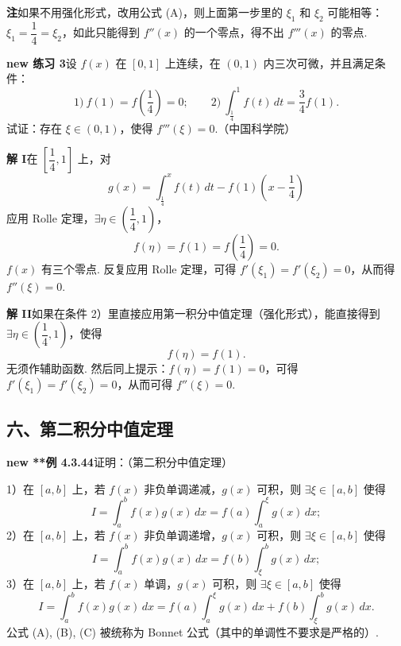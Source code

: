 \documentclass[UTF8, 12pt, fontset=fandol, oneside]{ctexart}
\begin{document}
\noindent\textbf{注}\quad 如果不用强化形式，改用公式 (A)，则上面第一步里的 $\xi_1$ 和 $\xi_2$ 可能相等：$\xi_1=\dfrac14=\xi_2$，如此只能得到 $f''(x)$ 的一个零点，得不出 $f'''(x)$ 的零点.

\noindent\textbf{new 练习 3}\quad 设 $f(x)$ 在 $[0,1]$ 上连续，在 $(0,1)$ 内三次可微，并且满足条件：
\[
1)\ f(1)=f\left(\frac14\right)=0;\qquad
2)\ \int_{\frac14}^1f(t)\,dt=\frac34f(1).
\]
试证：存在 $\xi\in(0,1)$，使得 $f'''(\xi)=0$.（中国科学院）

\noindent\textbf{解 I}\quad 在 $\left[\dfrac14,1\right]$ 上，对
\[
g(x)=\int_{\frac14}^x f(t)\,dt-f(1)\left(x-\frac14\right)
\]
应用 Rolle 定理，$\exists\eta\in\left(\dfrac14,1\right)$，
\[
f(\eta)=f(1)=f\left(\frac14\right)=0.
\]
$f(x)$ 有三个零点. 反复应用 Rolle 定理，可得 $f'(\xi_1)=f'(\xi_2)=0$，从而得
$f''(\xi)=0$.

\noindent\textbf{解 II}\quad 如果在条件 2）里直接应用第一积分中值定理（强化形式），能直接得到 $\exists\eta\in\left(\dfrac14,1\right)$，使得
\[
f(\eta)=f(1).
\]
无须作辅助函数. 然后同上提示：$f(\eta)=f(1)=0$，可得 $f'(\xi_1)=f'(\xi_2)=0$，从而可得 $f''(\xi)=0$.

\subsection*{六、第二积分中值定理}

\noindent\textbf{new **例 4.3.44}\quad 证明：（第二积分中值定理）

1）在 $[a,b]$ 上，若 $f(x)$ 非负单调递减，$g(x)$ 可积，则 $\exists\xi\in[a,b]$ 使得
\[
I=\int_a^b f(x)g(x)\,dx=f(a)\int_a^\xi g(x)\,dx;
\tag{A}
\]
2）在 $[a,b]$ 上，若 $f(x)$ 非负单调递增，$g(x)$ 可积，则 $\exists\xi\in[a,b]$ 使得
\[
I=\int_a^b f(x)g(x)\,dx=f(b)\int_\xi^b g(x)\,dx;
\tag{B}
\]
3）在 $[a,b]$ 上，若 $f(x)$ 单调，$g(x)$ 可积，则 $\exists\xi\in[a,b]$ 使得
\[
I=\int_a^b f(x)g(x)\,dx=f(a)\int_a^\xi g(x)\,dx+f(b)\int_\xi^b g(x)\,dx.
\tag{C}
\]
公式 (A), (B), (C) 被统称为 Bonnet 公式（其中的单调性不要求是严格的）.
\end{document}
